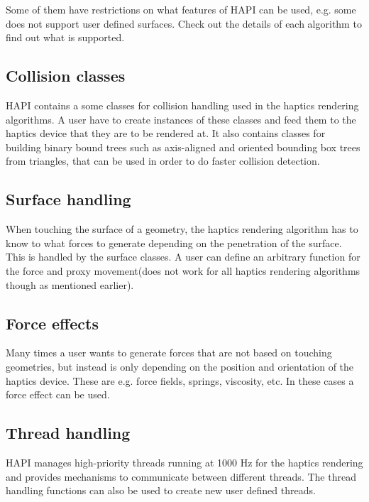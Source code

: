 Some of them have restrictions on what features of HAPI can be used,
e.g. some does not support user defined surfaces. Check out the
details of each algorithm to find out what is supported.

\subsection{Collision classes}
HAPI contains a some classes for collision handling used in the
haptics rendering algorithms. A user have to create instances of these
classes and feed them to the haptics device that they are to be
rendered at. It also contains classes for building binary bound trees
such as axis-aligned and oriented bounding box trees from triangles,
that can be used in order to do faster collision detection. 

\subsection{Surface handling}
When touching the surface of a geometry, the haptics rendering
algorithm has to know to what forces to generate depending on the
penetration of the surface. This is handled by the surface classes. A
user can define an arbitrary function for the force and proxy
movement(does not work for all haptics rendering algorithms though as
mentioned earlier).

\subsection{Force effects}
Many times a user wants to generate forces that are not based on
touching geometries, but instead is only depending on the position and
orientation of the haptics device. These are e.g. force fields,
springs, viscosity, etc. In these cases a force effect can be used.

\subsection{Thread handling}
HAPI manages high-priority threads running at 1000 Hz for the haptics
rendering and provides mechanisms to communicate between different
threads. The thread handling functions can also be used to create new
user defined threads.      


